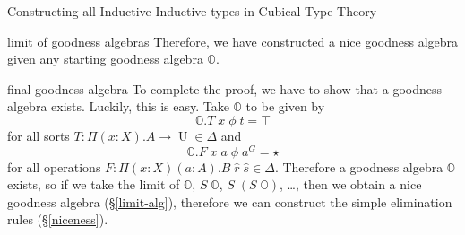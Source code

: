 \documentclass[acmsmall,review]{acmart}\settopmatter{printfolios=true,printccs=false,printacmref=false}
\DeclareMathOperator{\UU}{U}
\newcommand{\bbO}{\mathbb{O}}
\begin{document}
\begin{section}{Constructing all Inductive-Inductive types in Cubical Type Theory}
\begin{subsection}{limit of goodness algebras}
Therefore, we have constructed a nice goodness algebra given any starting goodness algebra $\bbO$.

\end{subsection}
\begin{subsection}{final goodness algebra}\label{final-alg}
To complete the proof, we have to show that a goodness algebra exists. Luckily, this is easy. Take $\bbO$ to be given by \[\bbO.T\;x\;\phi\;t = \top\] for all sorts $T : \Pi(x : X).A\to\UU\in\Delta$ and \[\bbO.F\;x\;a\;\phi\;a^G = \star\] for all operations $F : \Pi(x : X)(a : A).B\;\hat{r}\;\hat{s}\in\Delta$. Therefore a goodness algebra $\bbO$ exists, so if we take the limit of $\bbO$, $S\;\bbO$, $S\;(S\;\bbO)$, \dots, then we obtain a nice goodness algebra (\S\ref{limit-alg}), therefore we can construct the simple elimination rules (\S\ref{niceness}).
\end{subsection}

\end{section}
\end{document}
